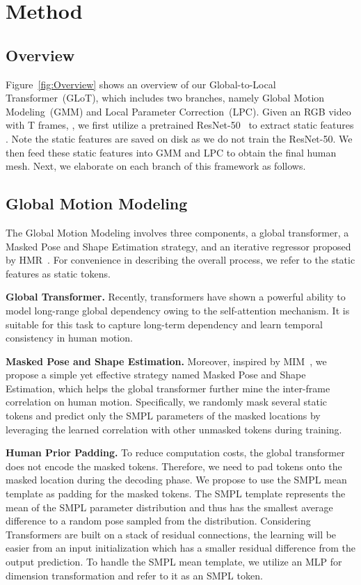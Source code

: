 \documentclass[10pt,twocolumn,letterpaper]{article}
\begin{document}
	\section{Method}
	\subsection{Overview}
	Figure~\ref{fig:Overview} shows an overview of our Global-to-Local Transformer~(GLoT), which includes two branches, namely Global Motion Modeling~(GMM) and Local Parameter Correction~(LPC).
	Given an RGB video  with T frames, , we first utilize a pretrained ResNet-50~\cite{ResNet, SPIN} to extract static features . Note the static features are saved on disk as we do not train the ResNet-50. 
	 We then feed these static features into GMM and LPC to obtain the final human mesh. Next, we elaborate on each branch of this framework as follows. 


	
	\subsection{Global Motion Modeling}
	\label{sec:gmm}
	   The Global Motion Modeling involves three components, \ie a global transformer, a Masked Pose and Shape Estimation strategy, and an iterative regressor proposed by HMR~\cite{HMR}. For convenience in describing the overall process, we refer to the static features as static tokens. 
	
	\noindent\textbf{Global Transformer.}
	Recently, transformers have shown a powerful ability to model long-range global dependency owing to the self-attention mechanism. It is suitable for this task to capture long-term dependency and learn temporal consistency in human motion. 
	
	\noindent\textbf{Masked Pose and Shape Estimation.}
	Moreover, inspired by MIM~\cite{MAE, BEIT}, we propose a simple yet effective strategy named Masked Pose and Shape Estimation, which helps the global transformer further mine the inter-frame correlation on human motion. Specifically, we randomly mask several static tokens and predict only the SMPL parameters of the masked locations by leveraging the learned correlation with other unmasked tokens during training.
	
	\noindent\textbf{Human Prior Padding.}
	To reduce computation costs, the global transformer does not encode the masked tokens. Therefore, we need to pad tokens onto the masked location during the decoding phase. 
	We propose to use the SMPL mean template as padding for the masked tokens.
	The SMPL template represents the mean of the SMPL parameter distribution and thus has the smallest average difference to a random pose sampled from the distribution. Considering Transformers are built on a stack of residual connections, the learning will be easier from an input initialization which has a smaller residual difference from the output prediction. To handle the SMPL mean template, we utilize an MLP for dimension transformation and refer to it as an SMPL token.
\end{document}
